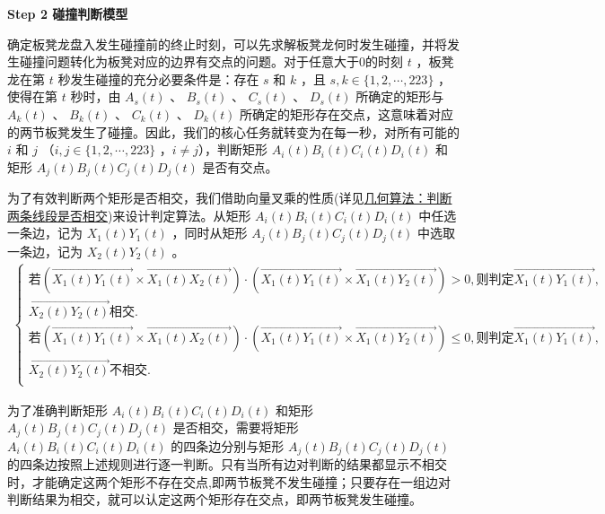 \documentclass{cumcmthesis}
\begin{document}
    \noindent\textbf{Step 2 碰撞判断模型}
\par 确定板凳龙盘入发生碰撞前的终止时刻，可以先求解板凳龙何时发生碰撞，并将发生碰撞问题转化为板凳对应的边界有交点的问题。对于任意大于0的时刻 \(t\) ，板凳龙在第 \(t\) 秒发生碰撞的充分必要条件是：存在 \(s\) 和 \(k\) ，且 \(s, k \in \{1, 2, \cdots, 223\}\) ，使得在第 \(t\) 秒时，由 \(A_s(t)\) 、 \(B_s(t)\) 、 \(C_s(t)\) 、 \(D_s(t)\) 所确定的矩形与 \(A_k(t)\) 、 \(B_k(t)\) 、 \(C_k(t)\) 、 \(D_k(t)\) 所确定的矩形存在交点，这意味着对应的两节板凳发生了碰撞。因此，我们的核心任务就转变为在每一秒，对所有可能的 \(i\) 和 \(j\) （\(i, j \in \{1, 2, \cdots, 223\}\) ，$i\ne j$），判断矩形 \(A_i(t)B_i(t)C_i(t)D_i(t)\) 和矩形 \(A_j(t)B_j(t)C_j(t)D_j(t)\) 是否有交点。
\par 为了有效判断两个矩形是否相交，我们借助向量叉乘的性质(详见\href{https://zhuanlan.zhihu.com/p/644689588}{几何算法：判断两条线段是否相交})来设计判定算法。从矩形 \(A_i(t)B_i(t)C_i(t)D_i(t)\) 中任选一条边，记为 \(X_1(t)Y_1(t)\) ，同时从矩形 \(A_j(t)B_j(t)C_j(t)D_j(t)\) 中选取一条边，记为 \(X_2(t)Y_2(t)\) 。
\begin{align}\label{1.........32}
    \begin{cases}
    \text{若}\left( \overrightarrow{X_1\left( t \right) Y_1\left( t \right) }\times \overrightarrow{X_1\left( t \right) X_2\left( t \right) } \right) \cdot \left( \overrightarrow{X_1\left( t \right) Y_1\left( t \right) }\times \overrightarrow{X_1\left( t \right) Y_2\left( t \right) } \right) >0,\text{则判定}\overrightarrow{X_1\left( t \right) Y_1\left( t \right) },
    \\\overrightarrow{X_2\left( t \right) Y_2\left( t \right) }\text{相交}.\\
    \text{若}\left( \overrightarrow{X_1\left( t \right) Y_1\left( t \right) }\times \overrightarrow{X_1\left( t \right) X_2\left( t \right) } \right) \cdot \left( \overrightarrow{X_1\left( t \right) Y_1\left( t \right) }\times \overrightarrow{X_1\left( t \right) Y_2\left( t \right) } \right) \leqslant 0,\text{则判定}\overrightarrow{X_1\left( t \right) Y_1\left( t \right) },
    \\\overrightarrow{X_2\left( t \right) Y_2\left( t \right) }\text{不相交}.\\
    \end{cases}
    \end{align}
    \par 为了准确判断矩形 \(A_i(t)B_i(t)C_i(t)D_i(t)\) 和矩形 \(A_j(t)B_j(t)C_j(t)D_j(t)\) 是否相交，需要将矩形 \(A_i(t)B_i(t)C_i(t)D_i(t)\) 的四条边分别与矩形 \(A_j(t)B_j(t)C_j(t)D_j(t)\) 的四条边按照上述规则进行逐一判断。只有当所有边对判断的结果都显示不相交时，才能确定这两个矩形不存在交点,即两节板凳不发生碰撞；只要存在一组边对判断结果为相交，就可以认定这两个矩形存在交点，即两节板凳发生碰撞。
\end{document}
